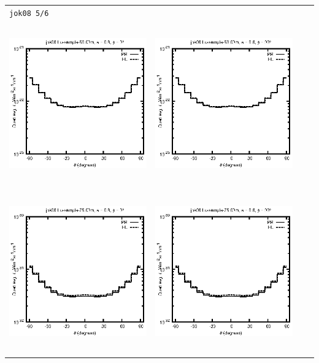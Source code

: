 \begin{tabular}{c c c c}
\multicolumn{4}{l}{\texttt{jok08 5/6}} \\
\includegraphics[height=7cm]{../eps/jok08_Lu_sample_50.00m_fwd.eps} &
\includegraphics[height=7cm]{../eps/jok08_Lu_sample_50.00m_cross.eps} \\
\includegraphics[height=7cm]{../eps/jok08_Lu_sample_75.00m_fwd.eps} &
\includegraphics[height=7cm]{../eps/jok08_Lu_sample_75.00m_cross.eps} \\

\end{tabular}
